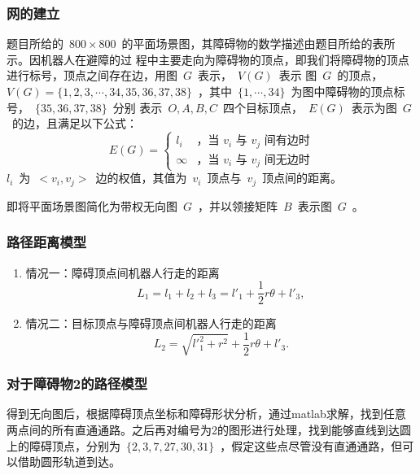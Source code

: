 \documentclass{JXUSTmodeling}
\begin{document}
\subsubsection{网的建立}\label{sec:5.2.1}
题目所给的~$800\times 800$~的平面场景图，其障碍物的数学描述由题目所给的表所示。因机器人在避障的过
程中主要走向为障碍物的顶点，即我们将障碍物的顶点进行标号，顶点之间存在边，用图~$G$~表示，~$V(G)$~表示
图~$G$~的顶点，~$V(G)=\{1,2,3,\cdots,34,35,36,37,38\}$~，其中~$\{1,\cdots,34\}$~为图中障碍物的顶点标号，~$\{35,36,37,38\}$~分别
表示~$O,A,B,C$~四个目标顶点，~$E(G)$~表示为图~$G$~的边，且满足以下公式：
\begin{equation}
  E(G) = 
  \begin{cases}
    l_i & \mbox{，当~$v_i$~与~$v_j$~间有边时} \\
    \infty & \mbox{，当~$v_i$~与~$v_j$~间无边时}
  \end{cases}
\end{equation}
$l_i$~为~$<v_i,v_j>$~边的权值，其值为~$v_i$~顶点与~$v_j$~顶点间的距离。\par
即将平面场景图简化为带权无向图~$G$~，并以领接矩阵~$B$~表示图~$G$~。


\subsubsection{路径距离模型}\label{sec:5.2.2}
\begin{enumerate}
  \item 情况一：障碍顶点间机器人行走的距离
  \begin{equation}
    L_1 = l_1 + l_2 + l_3 = l'_1 + \frac{1}{2}r\theta + l'_3,
  \end{equation}
  \item 情况二：目标顶点与障碍顶点间机器人行走的距离
  \begin{equation}
    L_2 = \sqrt{l'^2_1 + r^2} + \frac{1}{2}r\theta + l'_3.
  \end{equation}
\end{enumerate}
\subsubsection{对于障碍物2的路径模型}\label{sec:5.2.3}
得到无向图后，根据障碍顶点坐标和障碍形状分析，通过matlab求解，找到任意两点间的所有直通通路。之后再对编号为2的图形进行处理，找到能够直线到达圆上的障碍顶点，分别为~$\{2,3,7,27,30,31\}$~，假定这些点尽管没有直通通路，但可以借助圆形轨道到达。
\end{document}
